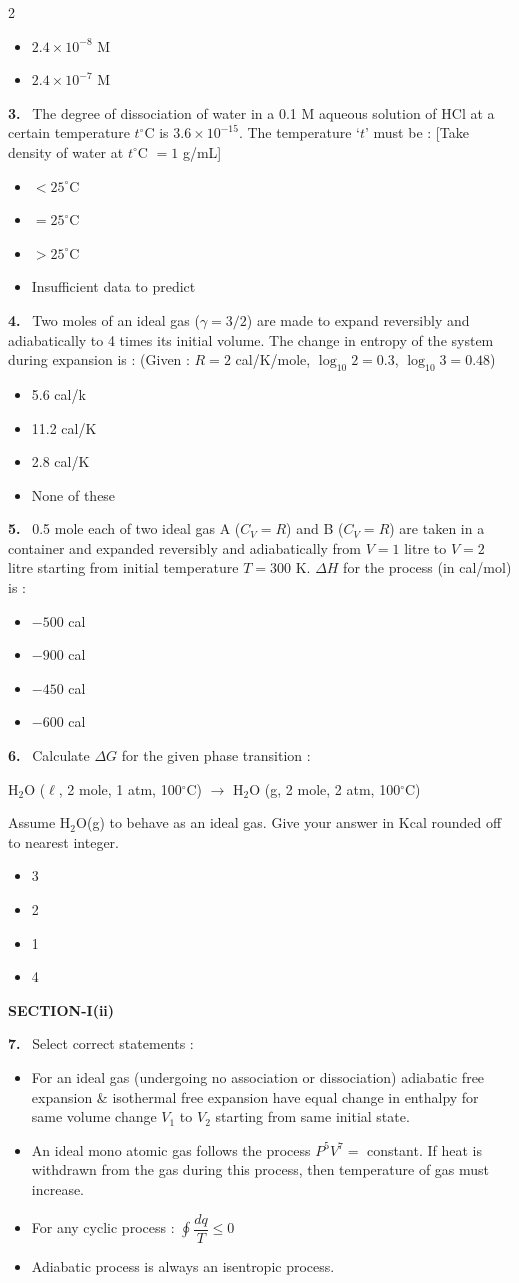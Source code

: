 \documentclass[10pt]{extarticle}
\newcommand{\sect}[1]{\par\smallskip\noindent\textbf{#1}\par}
\newcommand{\qn}[1]{\par\smallskip\noindent\textbf{#1.}~}
\newenvironment{qoptions}{\begin{itemize}[leftmargin=1.8em,itemsep=1pt,topsep=2pt,label={}]}{\end{itemize}}
\newcommand{\opt}[2]{\item[(#1)] #2}
\begin{document}
\begin{multicols}{2}
\begin{qoptions}
\opt{C}{$2.4\times10^{-8}$ M}
\opt{D}{$2.4\times10^{-7}$ M}
\end{qoptions}
\qn{3} The degree of dissociation of water in a 0.1 M aqueous solution of HCl at a certain temperature $t^\circ$C is $3.6\times10^{-15}$. The temperature `$t$' must be : [Take density of water at $t^\circ$C $=1$ g/mL]
\begin{qoptions}
\opt{A}{$<25^\circ$C}
\opt{B}{$=25^\circ$C}
\opt{C}{$>25^\circ$C}
\opt{D}{Insufficient data to predict}
\end{qoptions}
\qn{4} Two moles of an ideal gas ($\gamma=3/2$) are made to expand reversibly and adiabatically to 4 times its initial volume. The change in entropy of the system during expansion is : (Given : $R=2$ cal/K/mole, $\log_{10}2=0.3$, $\log_{10}3=0.48$)
\begin{qoptions}
\opt{A}{5.6 cal/k}
\opt{B}{11.2 cal/K}
\opt{C}{2.8 cal/K}
\opt{D}{None of these}
\end{qoptions}
\qn{5} 0.5 mole each of two ideal gas A ($C_V=R$) and B ($C_V=R$) are taken in a container and expanded reversibly and adiabatically from $V=1$ litre to $V=2$ litre starting from initial temperature $T=300$ K. $\Delta H$ for the process (in cal/mol) is :
\begin{qoptions}
\opt{A}{$-500$ cal}
\opt{B}{$-900$ cal}
\opt{C}{$-450$ cal}
\opt{D}{$-600$ cal}
\end{qoptions}
\qn{6} Calculate $\Delta G$ for the given phase transition :\par
H$_2$O ($\ell$, 2 mole, 1 atm, 100$^\circ$C) $\longrightarrow$ H$_2$O (g, 2 mole, 2 atm, 100$^\circ$C)\par
Assume H$_2$O(g) to behave as an ideal gas. Give your answer in Kcal rounded off to nearest integer.
\begin{qoptions}
\opt{A}{3}
\opt{B}{2}
\opt{C}{1}
\opt{D}{4}
\end{qoptions}
\sect{SECTION-I(ii)}
\qn{7} Select correct statements :
\begin{qoptions}
\opt{A}{For an ideal gas (undergoing no association or dissociation) adiabatic free expansion \& isothermal free expansion have equal change in enthalpy for same volume change $V_1$ to $V_2$ starting from same initial state.}
\opt{B}{An ideal mono atomic gas follows the process $P^5V^7=$ constant. If heat is withdrawn from the gas during this process, then temperature of gas must increase.}
\opt{C}{For any cyclic process : $\displaystyle\oint\dfrac{dq}{T}\leqslant0$}
\opt{D}{Adiabatic process is always an isentropic process.}
\end{qoptions}

\end{multicols}
\end{document}
